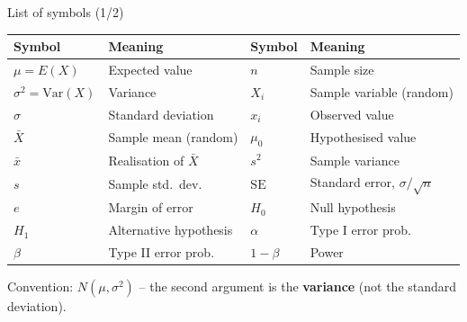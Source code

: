 \documentclass[aspectratio=169,11pt]{beamer}
\begin{document}
\begin{frame}{List of symbols (1/2)}
  \begin{center}
    \renewcommand{\arraystretch}{1.15}
    \begin{tabular}{@{}lp{4.1cm}lp{4.1cm}@{}}
      \toprule
      \textbf{Symbol} & \textbf{Meaning} & \textbf{Symbol} & \textbf{Meaning} \\
      \midrule
      $\mu=E(X)$              & Expected value        & $n$             & Sample size \\
      $\sigma^{2}=\mathrm{Var}(X)$ & Variance         & $X_i$           & Sample variable (random) \\
      $\sigma$                & Standard deviation    & $x_i$           & Observed value \\
      $\bar{X}$               & Sample mean (random)  & $\mu_0$         & Hypothesised value \\
      $\bar{x}$               & Realisation of $\bar X$ & $s^{2}$       & Sample variance \\
      $s$                     & Sample std.\ dev.     & $\mathrm{SE}$   & Standard error, $\sigma/\sqrt n$ \\
      $e$                     & Margin of error       & $H_0$           & Null hypothesis \\
      $H_1$                   & Alternative hypothesis & $\alpha$       & Type I error prob. \\
      $\beta$                 & Type II error prob.   & $1-\beta$       & Power \\
      \bottomrule
    \end{tabular}
  \end{center}
  \begin{center}
    \footnotesize Convention: $N(\mu,\sigma^{2})$ -- the second argument is the
    \textbf{variance} (not the standard deviation).
  \end{center}
\end{frame}
\end{document}
